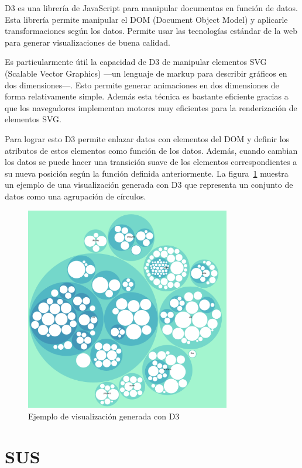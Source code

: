 D3 es una librería de JavaScript para manipular documentas en función de datos. Esta librería permite manipular el DOM (Document Object Model) y aplicarle transformaciones según los datos. Permite usar las tecnologías estándar de la web para generar visualizaciones de buena calidad.

Es particularmente útil la capacidad de D3 de manipular elementos SVG (Scalable Vector Graphics) ---un lenguaje de markup para describir gráficos en dos dimensiones---. Esto permite generar animaciones en dos dimensiones de forma relativamente simple. Además esta técnica es bastante eficiente gracias a que los navegadores implementan motores muy eficientes para la renderización de elementos SVG.

Para lograr esto D3 permite enlazar datos con elementos del DOM y definir los atributos de estos elementos como función de los datos. Además, cuando cambian los datos se puede hacer una transición suave de los elementos correspondientes a su nueva posición según la función definida anteriormente. La figura~\ref{fig:d3-ejemplo} muestra un ejemplo de una visualización generada con D3 que representa un conjunto de datos como una agrupación de círculos.

\begin{figure}[htb]
    \centering
    \includegraphics[width=0.8\textwidth]{imagenes/d3/ejemplo.png}
    \caption{Ejemplo de visualización generada con D3}
    \label{fig:d3-ejemplo}
\end{figure}

\section{SUS}
